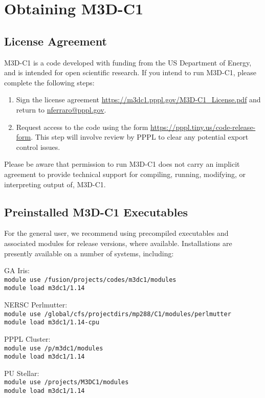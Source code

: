 \section{Obtaining M3D-C1}

\subsection{License Agreement}
\label{sec:license}

M3D-C1 is a code developed with funding from the US Department of
Energy, and is intended for open scientific research.  If you intend
to run M3D-C1, please complete the following steps:

\begin{enumerate}
\item Sign the license agreement
  \url{https://m3dc1.pppl.gov/M3D-C1\_License.pdf} and return to
  \href{mailto:nferraro@pppl.gov}{nferraro@pppl.gov}.
\item Request access to the code using the form
  \url{https://pppl.tiny.us/code-release-form}.  This step will
  involve review by PPPL to clear any potential export control issues.
\end{enumerate}

Please be aware that permission to run M3D-C1 does not carry an
implicit agreement to provide technical support for compiling,
running, modifying, or interpreting output of, M3D-C1.


\subsection{Preinstalled M3D-C1 Executables}

For the general user, we recommend using precompiled executables and
associated modules for release versions, where available.
Installations are presently available on a number of systems,
including:

\begin{description}
\item{GA Iris}:\\
  \texttt{module use /fusion/projects/codes/m3dc1/modules}\\
  \texttt{module load m3dc1/1.14}
\item{NERSC Perlmutter}:\\
  \texttt{module use /global/cfs/projectdirs/mp288/C1/modules/perlmutter}\\
  \texttt{module load m3dc1/1.14-cpu}
\item{PPPL Cluster}:\\
  \texttt{module use /p/m3dc1/modules}\\
  \texttt{module load m3dc1/1.14}
\item{PU Stellar}:\\
  \texttt{module use /projects/M3DC1/modules}\\
  \texttt{module load m3dc1/1.14}
\end{description}

